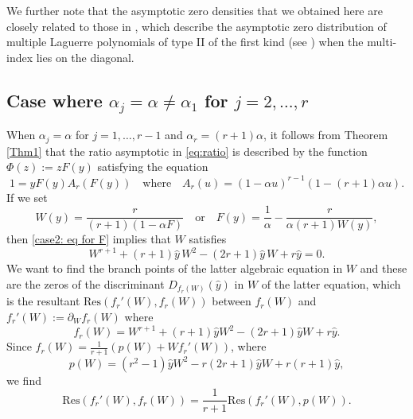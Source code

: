 \documentclass[12pt]{article}
\numberwithin{equation}{section}
\begin{document}
We further note that the asymptotic zero densities that we obtained here are closely related to those in \cite[Thm 1.2]{Neuschel}, which describe the asymptotic zero distribution of multiple Laguerre polynomials of type II of the first kind (see \cite[\S 23.4.1]{Ismail}) when the multi-index lies on the diagonal. 

\bigskip


\subsection{Case where \(\alpha_j=\alpha\neq \alpha_1\) for \(j=2,\ldots,r\)}

When \(\alpha_j=\alpha\) for \(j=1,\ldots, r-1\) and \(\alpha_r=(r+1)\alpha\), it follows from Theorem \ref{Thm1} that the ratio asymptotic in \eqref{eq:ratio} is described by the function $\Phi(z):=zF(y)$ satisfying the equation 
\begin{equation}\label{case2: eq for F}
1= y F(y) A_r(F(y)) \quad \text{where} \quad A_r(u) = (1-\alpha u)^{r-1} (1-(r+1) \alpha u).
\end{equation}
If we set  
\[W(y)=\frac{r}{(r+1) (1-\alpha  F)}
\quad \text{or} \quad F(y)=\frac{1}{\alpha }-\frac{r}{\alpha  (r+1) W(y)}, \]
then \eqref{case2: eq for F} implies that $W$ satisfies 
 \[
	W^{r+1} +(r+1) \hat{y}\,W^2 
	-  (2 r+1) \hat{y} \,   W +r  \hat{y} =0. 
 \]
 We want to find the  branch points of the latter algebraic equation in $W$ and these are the zeros of the discriminant $D_{f_r(W)}(\hat{y}) $ in $W$ of the latter equation, which  is the resultant $\mathrm{Res}(f_r'(W),f_r(W))$ between $f_r(W)$ and $f_r'(W):=\partial_W f_r(W)$ where 
$$f_r(W)=  W^{r+1}+ (r+1)  \hat{y} W^2-(2 r+1)  \hat{y} W+r  \hat{y}.$$ 
Since 
$f_r(W) = \frac{1}{r+1} \left(p(W) + W f_r'(W)\right)$, where 
$$p(W)=\left(r^2-1\right)  \hat{y} W^2-r (2 r+1)  \hat{y} W+r (r+1)  \hat{y}, $$
we find
$$
	\mathrm{Res}(f_r'(W),f_r(W)) = \frac{1}{r+1}\mathrm{Res}(f_r'(W),p(W)). 
$$
\end{document}

